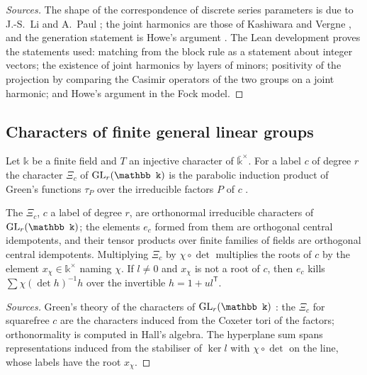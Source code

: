 \begin{proof}[Sources]
The shape of the correspondence of discrete series parameters is due to J.-S.~Li \cite{Li1990} and A.~Paul
\cite{Paul1999}; the joint harmonics are those of Kashiwara and Vergne \cite{KashiwaraVergne1978}, and the generation
statement is Howe's argument \cite{Howe1989}. The Lean development proves the statements used: matching from the block
rule as a statement about integer vectors; the existence of joint harmonics by layers of minors; positivity of the
projection by comparing the Casimir operators of the two groups on a joint harmonic; and Howe's argument in the Fock
model.
\end{proof}

\subsection{Characters of finite general linear groups}\label{ss:B-green}
Let $\mathbb k$ be a finite field and $T$ an injective character of $\bar{\mathbb k}^\times$. For a label $c$ of degree $r$ the
character $\Xi_c$ of $\GL_r(\mathbb k)$ is the parabolic induction product of Green's functions $\tau_P$ over the irreducible
factors $P$ of $c$ \cite{Green1955}.

\begin{theorem}\label{thm:B-green}
The $\Xi_c$, $c$ a label of degree $r$, are orthonormal irreducible characters of $\GL_r(\mathbb k)$; the elements $e_c$ formed
from them are orthogonal central idempotents, and their tensor products over finite families of fields are orthogonal central
idempotents. Multiplying $\Xi_c$ by $\chi\circ\det$ multiplies the roots of $c$ by the element $x_\chi\in\mathbb k^\times$ naming
$\chi$. If $l\ne0$ and $x_\chi$ is not a root of $c$, then $e_c$ kills $\sum\chi(\det h)^{-1}h$ over the invertible $h=1+ul^{\mathsf T}$.
\end{theorem}

\begin{proof}[Sources]
Green's theory of the characters of $\GL_r(\mathbb k)$ \cite{Green1955}: the $\Xi_c$ for squarefree $c$ are the characters
induced from the Coxeter tori of the factors; orthonormality is computed in Hall's algebra. The hyperplane sum spans
representations induced from the stabiliser of $\ker l$ with $\chi\circ\det$ on the line, whose labels have the root $x_\chi$.
\end{proof}

